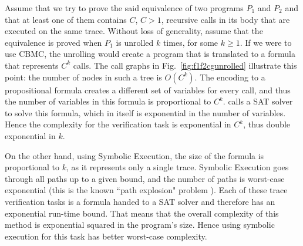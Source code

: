Assume that we try to prove the said equivalence of two programs $P_1$ and $P_2$ and that at least one of them contains $C$, $C>1$, recursive calls in its body that are executed on the same trace. Without loss of generality, assume that the equivalence is proved when $P_1$ is unrolled $k$ times, for some $k \geq 1$. 
If we were to use CBMC, the unrolling would create a program that is translated to a formula that represents  $C^k$ calls. The call graphs in Fig.~\ref{fig:f1f2cgunrolled} illustrate this point: the number of nodes in such a tree is $O(C^k)$. The encoding to a propositional formula creates a different set of variables for every call, and thus the number of variables in this formula is proportional to $C^k$.  calls a SAT solver to solve this formula, which in itself is exponential in the number of variables. Hence the complexity for the verification task is exponential in $C^k$, thus double exponential in $k$.

On the other hand, using Symbolic Execution, the size of the formula is proportional to $k$, as it represents only a single trace. Symbolic Execution goes through all paths up to a given bound, and the number of paths is worst-case exponential (this is the known ``path explosion" problem  \cite{10.1007/978-3-540-78800-3_28}). Each of these trace verification tasks is a formula handed to a SAT solver and therefore has an exponential run-time bound. That means that the overall complexity of this method is exponential squared in the program's size. 
Hence using symbolic execution for this task has better worst-case complexity.


